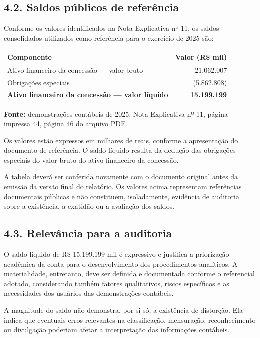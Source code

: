 \documentclass[
]{article}
\newcounter{none} %
\begin{document}
\subsection{4.2. Saldos públicos de
referência}\label{saldos-puxfablicos-de-referuxeancia}

Conforme os valores identificados na Nota Explicativa nº 11, os saldos
consolidados utilizados como referência para o exercício de 2025 são:

{\def\LTcaptype{none} %
\begin{longtable}[]{@{}lr@{}}
\toprule\noalign{}
Componente & Valor (R\$ mil) \\
\midrule\noalign{}
\endhead
\bottomrule\noalign{}
\endlastfoot
Ativo financeiro da concessão --- valor bruto & 21.062.007 \\
Obrigações especiais & (5.862.808) \\
\textbf{Ativo financeiro da concessão --- valor líquido} &
\textbf{15.199.199} \\
\end{longtable}
}

\textbf{Fonte:} demonstrações contábeis de 2025, Nota Explicativa nº 11,
página impressa 44, página 46 do arquivo PDF.

Os valores estão expressos em milhares de reais, conforme a apresentação
do documento de referência. O saldo líquido resulta da dedução das
obrigações especiais do valor bruto do ativo financeiro da concessão.

A tabela deverá ser conferida novamente com o documento original antes
da emissão da versão final do relatório. Os valores acima representam
referências documentais públicas e não constituem, isoladamente,
evidência de auditoria sobre a existência, a exatidão ou a avaliação dos
saldos.

\subsection{4.3. Relevância para a
auditoria}\label{relevuxe2ncia-para-a-auditoria}

O saldo líquido de R\$ 15.199.199 mil é expressivo e justifica a
priorização acadêmica da conta para o desenvolvimento dos procedimentos
analíticos. A materialidade, entretanto, deve ser definida e documentada
conforme o referencial adotado, considerando também fatores
qualitativos, riscos específicos e as necessidades dos usuários das
demonstrações contábeis.

A magnitude do saldo não demonstra, por si só, a existência de
distorção. Ela indica que eventuais erros relevantes na classificação,
mensuração, reconhecimento ou divulgação poderiam afetar a interpretação
das informações contábeis.
\end{document}
